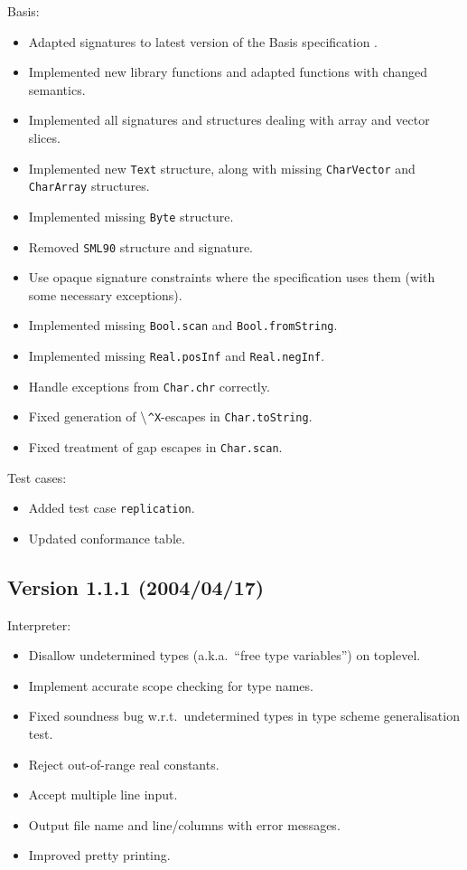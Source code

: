 \documentclass[twoside,titlepage]{article}
\begin{document}
\begin{appendix}
Basis:
\begin{itemize} \setlength{\itemsep}{0em}
\item Adapted signatures to latest version of the Basis specification \cite{basis}.
\item Implemented new library functions and adapted functions with changed semantics.
\item Implemented all signatures and structures dealing with array and vector slices.
\item Implemented new {\tt Text} structure, along with missing {\tt CharVector} and {\tt CharArray} structures.
\item Implemented missing {\tt Byte} structure.
\item Removed {\tt SML90} structure and signature.
\item Use opaque signature constraints where the specification uses them (with some necessary exceptions).
\item Implemented missing {\tt Bool.scan} and {\tt Bool.fromString}.
\item Implemented missing {\tt Real.posInf} and {\tt Real.negInf}.
\item Handle exceptions from {\tt Char.chr} correctly.
\item Fixed generation of $\tt\backslash${\tt\^{}X}-escapes in {\tt Char.toString}.
\item Fixed treatment of gap escapes in {\tt Char.scan}.
\end{itemize}

Test cases:
\begin{itemize} \setlength{\itemsep}{0em}
\item Added test case {\tt replication}.
\item Updated conformance table.
\end{itemize}

\subsection*{Version 1.1.1 (2004/04/17)}

Interpreter:
\begin{itemize} \setlength{\itemsep}{0em}
\item Disallow undetermined types (a.k.a.\ ``free type variables'') on toplevel.
\item Implement accurate scope checking for type names.
\item Fixed soundness bug w.r.t.\ undetermined types in type scheme generalisation test.
\item Reject out-of-range real constants.
\item Accept multiple line input.
\item Output file name and line/columns with error messages.
\item Improved pretty printing.
\end{itemize}


\end{appendix}
\end{document}
